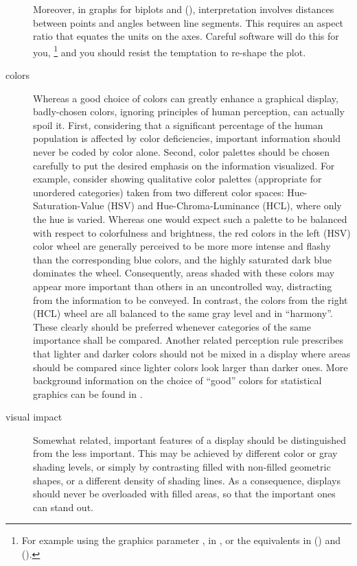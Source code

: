 \documentclass[10pt,krantz2]{krantz}\usepackage[]{graphicx}\usepackage[]{color}
\begin{document}
\begin{description}
 Moreover, in graphs for biplots and \ca (),
 interpretation involves distances between points and
 angles between line segments. This requires an aspect ratio
 that equates the units on the axes.  Careful software will
 do this for you,%
 \footnote{
 For example using the graphics parameter ,
  in ,
 or the equivalents in  ()
 and  ().
 }
 and you should resist the temptation to re-shape the plot.

\item[colors] Whereas a good choice of colors can greatly enhance a
  graphical display, badly-chosen colors, ignoring principles of 
  human perception, can actually spoil it. First, considering that
  a significant percentage of the human population
  is affected by color deficiencies, important information should
  never be coded by color alone. Second, color palettes should be
  chosen carefully to put the desired emphasis on the information 
  visualized. For example, consider 
  showing qualitative color palettes 
  (appropriate for unordered categories)
  taken from two different color spaces: Hue-Saturation-Value (HSV) 
  and Hue-Chroma-Luminance (HCL), where only the hue is varied. 
  Whereas one would expect such a palette to be
  balanced with respect to colorfulness and
  brightness, the red colors in the left (HSV) 
  color wheel are generally perceived to
  be more more intense and flashy than the corresponding blue
  colors, and the highly saturated dark blue dominates the wheel.
  Consequently, areas shaded with these colors may appear more
  important than others in an uncontrolled way, distracting from the
  information to be conveyed. In contrast, the colors from the right (HCL)
  wheel are all balanced to the same gray level and in
  ``harmony''. These clearly should be preferred whenever categories of the
  same importance shall be compared.
  Another related perception rule prescribes that lighter and darker colors
  should not be mixed in a display
  where areas should be compared since lighter colors look larger than
  darker ones. More background information on the
  choice of ``good'' colors for statistical graphics 
  can be found in \citet{Zeileis-etal:2009}.
  
\item[visual impact] Somewhat related,
  important features of a display 
  should be distinguished from the less important. This may be
  achieved by different color or gray shading levels, 
  or simply by contrasting
  filled with non-filled geometric shapes, or a different density of
  shading lines. As a consequence, displays should never be overloaded
  with filled areas, so that the important ones can stand out.


\end{description}
\end{document}
